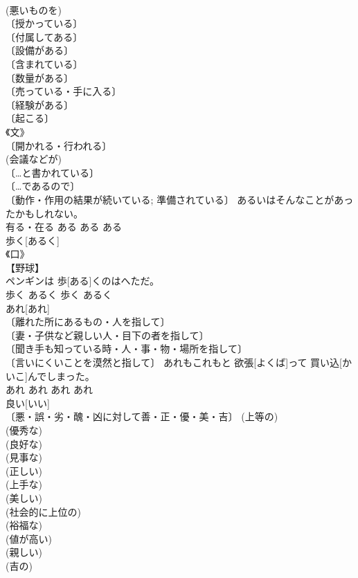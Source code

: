 \documentclass[8pt]{extreport}
\begin{document}
\begin{CJK}{UTF8}{min}
\\	(悪いものを) 
\\	〔授かっている〕 
\\	〔付属してある〕 
\\	〔設備がある〕 
\\	〔含まれている〕 
\\	〔数量がある〕 
\\	〔売っている・手に入る〕 
\\	〔経験がある〕 
\\	〔起こる〕 
\\	《文》 
\\	〔開かれる・行われる〕 
\\	(会議などが) 
\\	〔…と書かれている〕 
\\	〔…であるので〕 
\\	〔動作・作用の結果が続いている; 準備されている〕	あるいはそんなことがあったかもしれない。	
\\	有る・在る	ある	ある	ある	
\\	歩く[あるく]	
\\	《口》 
\\	【野球】 
\\	ペンギンは 歩[ある]くのはへただ。	
\\	歩く	あるく	歩く	あるく	
\\	あれ[あれ]	
\\	〔離れた所にあるもの・人を指して〕 
\\	〔妻・子供など親しい人・目下の者を指して〕 
\\	〔聞き手も知っている時・人・事・物・場所を指して〕 
\\	〔言いにくいことを漠然と指して〕	あれもこれもと 欲張[よくば]って 買い込[かいこ]んでしまった。	
\\	あれ	あれ	あれ	あれ	
\\	良い[いい]	
\\	〔悪・誤・劣・醜・凶に対して善・正・優・美・吉〕 (上等の) 
\\	(優秀な) 
\\	(良好な) 
\\	(見事な) 
\\	(正しい) 
\\	(上手な) 
\\	(美しい) 
\\	(社会的に上位の) 
\\	(裕福な) 
\\	(値が高い) 
\\	(親しい) 
\\	(吉の) 

\end{CJK}
\end{document}
